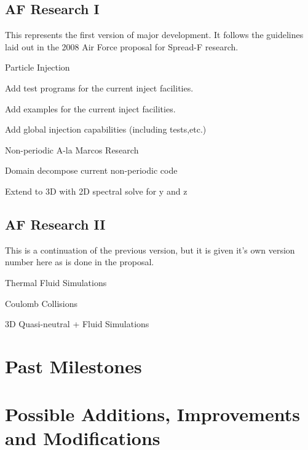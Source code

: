 \subsection{AF Research I}
This represents the first version of major development. It follows the
guidelines laid out in the 2008 Air Force proposal for Spread-F
research. 
\begin{versionList}
\item Particle Injection
  \begin{minor_versionList}
    \item Add test programs for the current inject facilities.
    \item Add examples for the current inject facilities. 
    \item Add global injection capabilities (including tests,etc.)      
  \end{minor_versionList}
\item Non-periodic A-la Marcos Research
  \begin{minor_versionList}
    \item Domain decompose current non-periodic code
    \item Extend to 3D with 2D spectral solve for y and z
    \end{minor_versionList}
\end{versionList}


\subsection{AF Research II}
This is a continuation of the previous version, but it is given it's
own version number here as is done in the proposal.
\begin{versionList}
\item Thermal Fluid Simulations  
\item Coulomb Collisions
\item 3D Quasi-neutral + Fluid Simulations
\end{versionList}


\section{Past Milestones}



\section{Possible Additions, Improvements and Modifications}

